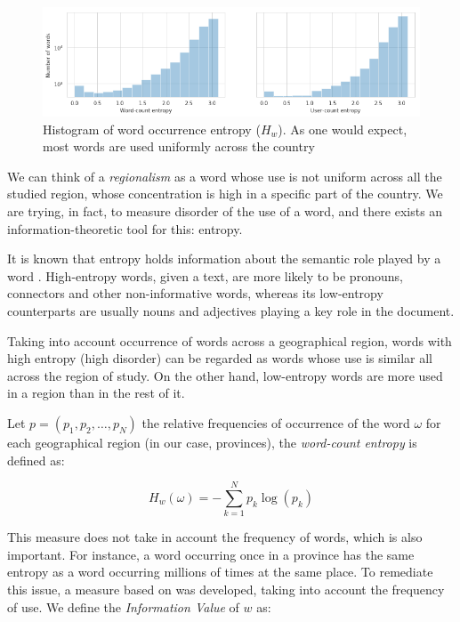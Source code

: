 

\begin{figure}[t]
\centering
\includegraphics[width=\textwidth]{./images/entropies.png}
\caption{Histogram of word occurrence entropy ($H_w$). As one would expect, most words are used uniformly across the country} 
\label{fig:word_ocurrence_entropy} 
\end{figure}


We can think of a \emph{regionalism} as a word whose use is not uniform across all the studied region, whose concentration is high in a specific part of the country. We are trying, in fact, to measure disorder of the use of a word, and there exists an information-theoretic tool for this: entropy.

It is known that entropy holds information about the semantic role played by a word \cite{montemurro2002entropic, montemurro2010towards}. High-entropy words, given a text, are more likely to be pronouns, connectors and other non-informative words, whereas its low-entropy counterparts are usually nouns and adjectives playing a key role in the document. 

Taking into account occurrence of words across a geographical region, words with high entropy (high disorder) can be regarded as words whose use is similar all across the region of study. On the other hand, low-entropy words are more used in a region than in the rest of it.

Let $p = (p_1, p_2, \ldots, p_N)$ the relative frequencies of occurrence of the word $\omega$ for each geographical region (in our case, provinces), the \emph{word-count entropy} is defined as:

\begin{equation}
    H_w(\omega) = -\sum \limits_{k=1}^{N} p_k \log(p_k)
\end{equation}


This measure does not take in account the frequency of words, which is also important. For instance, a word occurring once in a province has the same entropy as a word occurring millions of times at the same place. To remediate this issue, a measure based on \cite{montemurro2010towards} was developed, taking into account the frequency of use. We define the \emph{Information Value} of $w$ as:

